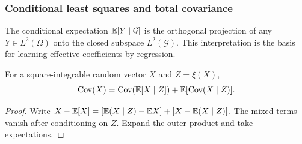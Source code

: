\documentclass[12pt,a4paper,oneside]{book}
\begin{document}
\subsubsection{Conditional least squares and total covariance}
The conditional expectation $\mathbb{E}[Y\mid\mathcal G]$ is the orthogonal
projection of any $Y\in L^2(\Omega)$ onto the closed subspace
$L^2(\mathcal G)$. This interpretation is the basis for learning effective
coefficients by regression.

\begin{proposition}
\label{prop:totalcov}
\label{src:p13q1}
For a square-integrable random vector $X$ and $Z=\xi(X)$,
\begin{equation*}
\operatorname{Cov}(X)=
 \operatorname{Cov}(\mathbb{E}[X\mid Z])
 +\mathbb{E}[\operatorname{Cov}(X\mid Z)].
\end{equation*}
\end{proposition}
\begin{proof}
Write $X-\mathbb{E}[X]=[\mathbb{E}(X\mid Z)-\mathbb{E} X]+[X-\mathbb{E}(X\mid Z)]$.
The mixed terms vanish after conditioning on $Z$. Expand the outer
product and take expectations.
\end{proof}
\end{document}
